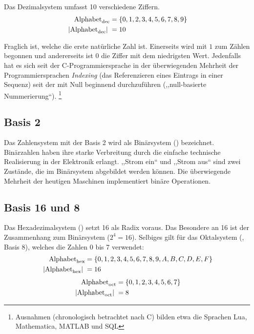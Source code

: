 Das Dezimalsystem umfasst 10 verschiedene Ziffern.
\begin{align*}
         \text{Alphabet}_{\text{dec}} &= \{0, 1, 2, 3, 4, 5, 6, 7, 8, 9\} \\
  \hspace{3pt}\left| \text{Alphabet}_{\text{dec}}\right|\hspace{3pt} &= 10 
\end{align*}

Fraglich ist, welche die erste natürliche Zahl ist. Einerseits wird mit $1$ zum
Zählen begonnen und andererseits ist $0$ die Ziffer mit dem niedrigsten Wert.
Jedenfalls hat es sich seit der C-Programmiersprache in der überwiegenden
Mehrheit der Programmiersprachen \emph{Indexing} (das Referenzieren eines
Eintrags in einer Sequenz) seit der mit Null beginnend durchzuführen
(,,null-basierte Nummerierung``).%
\footnote{Ausnahmen (chronologisch betrachtet nach C) bilden etwa die Sprachen
Lua, Mathematica, MATLAB und SQL}
%
\subsection{Basis 2}
%
Das Zahlensystem mit der Basis 2 wird als Binärsystem () bezeichnet.
Binärzahlen  haben ihre starke Verbreitung durch die einfache technische
Realisierung in der Elektronik erlangt. ,,Strom ein`` und ,,Strom aus``
sind zwei Zustände, die im Binärsystem abgebildet werden können.
Die überwiegende Mehrheit der heutigen Maschinen
implementiert binäre Operationen.
%
\subsection{Basis 16 und 8}
%
Das Hexadezimalsystem () setzt 16 als Radix voraus. Das Besondere an
16 ist der Zusammenhang zum Binärsystem ($2^4 = 16$). Selbiges gilt für
das Oktalsystem (, Basis 8), welches die Zahlen 0 bis 7 verwendet:
%
\begin{align*}
  \text{Alphabet}_{\text{hex}} &= \{0, 1, 2, 3, 4, 5, 6, 7, 8, 9, A, B, C, D, E, F\} \\
  \hspace{3pt}\left| \text{Alphabet}_{\text{hex}}\right|\hspace{3pt} &= 16 
\end{align*}
%
\begin{align*}
  \text{Alphabet}_{\text{oct}} &= \{0, 1, 2, 3, 4, 5, 6, 7\} \\
  \hspace{3pt}\left| \text{Alphabet}_{\text{oct}}\right|\hspace{3pt} &= 8
\end{align*}
%
